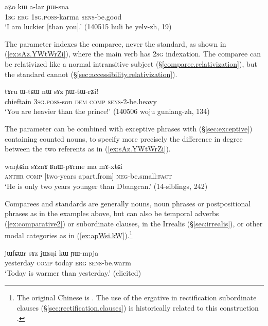 \begin{exe}
\ex \label{ex:aZo.kW.alaz}
\gll aʑo kɯ a-laz ɲɯ-sna  \\
\textsc{1sg} \textsc{erg} \textsc{1sg}.\textsc{poss}-karma \textsc{sens}-be.good \\
\glt `I am luckier [than you].' (140515 huli he yelv-zh, 19)
\end{exe}


The parameter indexes the comparee, never the standard, as shown in (\ref{ex:sAz.YWtWrZi}), where the main verb has \textsc{2sg} indexation. The comparee can be relativized like a normal intransitive subject (§\ref{comparee.relativization}), but the standard cannot (§\ref{sec:accessibility.relativization}).

\begin{exe}
\ex \label{ex:sAz.YWtWrZi}
\gll tɤru ɯ-tɕɯ nɯ sɤz ɲɯ-tɯ-rʑi! \\
chieftain \textsc{3sg}.\textsc{poss}-son \textsc{dem} \textsc{comp} \textsc{sens}-2-be.heavy \\
\glt `You are heavier than the prince!' (140506 woju guniang-zh, 134)
\end{exe}

The parameter can be combined with exceptive phrases
with  (§\ref{sec:exceptive}) containing counted nouns, to specify more precisely the difference in degree between the two referents as in (\ref{ex:sAz.YWtWrZi}).

\begin{exe}
\ex \label{ex:RWpArme.ma.mAxtCi}
\gll waŋtɕin sɤznɤ ʁnɯ-pɤrme ma mɤ-xtɕi \\
\textsc{anthr} \textsc{comp} [two-years apart.from] \textsc{neg}-be.small:\textsc{fact} \\
\glt `He is only two years younger than Dbangcan.' (14-siblings, 242)
\end{exe}
 
Comparees and standards are generally nouns, noun phrases or postpositional phrases as in the examples above, but can also be temporal adverbs (\ref{ex:comparative2}) or subordinate clauses, in the Irrealis (§\ref{sec:irrealis}), or other modal categories as in (\ref{ex:apWsi.kW}).\footnote{The original Chinese is . The use of the ergative in rectification subordinate clauses (§\ref{sec:rectification.clauses}) is historically related to this construction \citep{jacques16comparative}. }
  
\begin{exe}
\ex \label{ex:comparative2}
\gll  jɯfɕɯr sɤz jɯsŋi kɯ ɲɯ-mpja \\
yesterday \textsc{comp} today \textsc{erg} \textsc{sens}-be.warm \\
\glt `Today is warmer than yesterday.' (elicited)
\end{exe}

